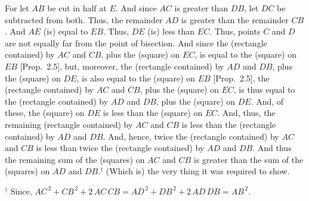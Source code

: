 \begin{Parallel}{}{}
{ For let $AB$ be cut in half at $E$. And since $AC$ is greater than
 $DB$, let $DC$ be subtracted from both. Thus, the remainder
 $AD$ is greater than the remainder $CB$. And $AE$ (is) equal to $EB$.
 Thus, $DE$ (is) less than $EC$. Thus, points $C$ and $D$ are not
 equally far from the point of bisection. And since the (rectangle
 contained) by $AC$ and $CB$, plus the (square) on $EC$,
 is equal to the (square) on $EB$ [Prop.~2.5], 
 but, moreover, the (rectangle contained) by $AD$ and $DB$, plus the
 (square) on $DE$, is also equal to the (square) on $EB$ [Prop.~2.5], the (rectangle contained) by $AC$ and
 $CB$, plus the (square) on $EC$, is thus equal to the (rectangle contained)
 by $AD$ and $DB$, plus the (square) on $DE$. And, of these, the
 (square) on $DE$ is less than the (square) on $EC$. And, thus, the remaining
 (rectangle contained) by $AC$ and $CB$ is  less than
 the (rectangle contained) by $AD$ and $DB$. And, hence, twice
 the (rectangle contained) by $AC$ and $CB$ is less than twice the
 (rectangle contained) by $AD$ and $DB$. And thus the remaining
 sum of the (squares) on $AC$ and $CB$ is greater than the sum of the
 (squares) on $AD$ and $DB$.$^\dag$  (Which is) the very thing it was required to show.}
\end{Parallel}
{\footnotesize\noindent$^\dag$ Since, $AC^{\,2}+CB^{\,2}+2\,AC\,CB=
 AD^{\,2}+DB^{\,2}
+2\,AD\,DB = AB^{\,2}$.} 

